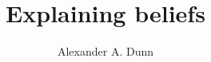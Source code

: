 \documentclass[11pt]{article}
\title{Explaining beliefs}
\author{Alexander A. Dunn}
\begin{document}
\maketitle
\tableofcontents
\begin{spacing}{1.25}









%

\end{spacing}


\end{document}
